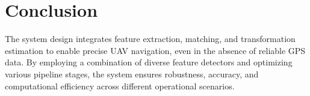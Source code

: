 \section{Conclusion}

The system design integrates feature extraction, matching, and transformation estimation to enable precise UAV navigation, even in the absence of reliable GPS data. By employing a combination of diverse feature detectors and optimizing various pipeline stages, the system ensures robustness, accuracy, and computational efficiency across different operational scenarios. 

